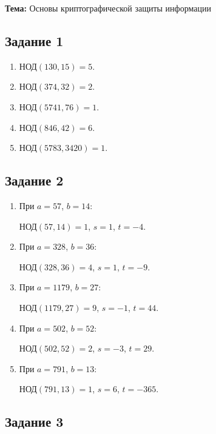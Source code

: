 \documentclass[a4paper,12pt]{article}
\begin{document}
\noindent\textbf{Тема:} Основы криптографической защиты информации\\

\subsection*{Задание 1}

\begin{enumerate}
  \item $\text{НОД}(130, 15) = 5$.
  \item $\text{НОД}(374, 32) = 2$.
  \item $\text{НОД}(5741, 76) = 1$.
  \item $\text{НОД}(846, 42) = 6$.
  \item $\text{НОД}(5783, 3420) = 1$.
\end{enumerate}

\subsection*{Задание 2}

\begin{enumerate}
  \item При $a = 57$, $b = 14$:

    $\text{НОД}(57, 14) = 1$, $s = 1$, $t = -4$.

  \item При $a = 328$, $b = 36$:

    $\text{НОД}(328, 36) = 4$, $s = 1$, $t = -9$.

  \item При $a = 1179$, $b = 27$:

    $\text{НОД}(1179, 27) = 9$, $s = -1$, $t = 44$.

  \item При $a = 502$, $b = 52$:

    $\text{НОД}(502, 52) = 2$, $s = -3$, $t = 29$.

  \item При $a = 791$, $b = 13$:

    $\text{НОД}(791, 13) = 1$, $s = 6$, $t = -365$.
\end{enumerate}

\subsection*{Задание 3}
\end{document}
